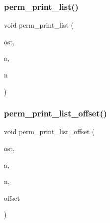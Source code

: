 \mbox{\label{combinatorics_8_c_a97254b51d3f118f7967df234114f2013}} 
\subsubsection{\texorpdfstring{perm\+\_\+print\+\_\+list()}{perm\_print\_list()}}
{\footnotesize\ttfamily void perm\+\_\+print\+\_\+list (\begin{DoxyParamCaption}\item[{ostream \&}]{ost,  }\item[{\mbox{\hyperlink{galois_8h_a09fddde158a3a20bd2dcadb609de11dc}{I\+NT}} $\ast$}]{a,  }\item[{\mbox{\hyperlink{galois_8h_a09fddde158a3a20bd2dcadb609de11dc}{I\+NT}}}]{n }\end{DoxyParamCaption})}

\mbox{\label{combinatorics_8_c_a4377714ceabfd4fa7ade53a8684bd37b}} 
\subsubsection{\texorpdfstring{perm\+\_\+print\+\_\+list\+\_\+offset()}{perm\_print\_list\_offset()}}
{\footnotesize\ttfamily void perm\+\_\+print\+\_\+list\+\_\+offset (\begin{DoxyParamCaption}\item[{ostream \&}]{ost,  }\item[{\mbox{\hyperlink{galois_8h_a09fddde158a3a20bd2dcadb609de11dc}{I\+NT}} $\ast$}]{a,  }\item[{\mbox{\hyperlink{galois_8h_a09fddde158a3a20bd2dcadb609de11dc}{I\+NT}}}]{n,  }\item[{\mbox{\hyperlink{galois_8h_a09fddde158a3a20bd2dcadb609de11dc}{I\+NT}}}]{offset }\end{DoxyParamCaption})}

\mbox{\label{combinatorics_8_c_ab87deef2ba9e4d2ce386a19eeaffecf3}} 
